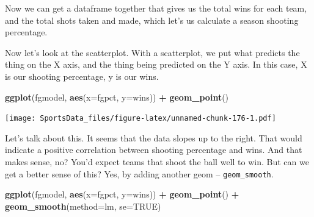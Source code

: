 \documentclass[]{book}
\newenvironment{Shaded}{\begin{snugshade}}{\end{snugshade}}
\newcommand{\DataTypeTok}[1]{\textcolor[rgb]{0.13,0.29,0.53}{#1}}
\newcommand{\KeywordTok}[1]{\textcolor[rgb]{0.13,0.29,0.53}{\textbf{#1}}}
\newcommand{\NormalTok}[1]{#1}
\newcommand{\OperatorTok}[1]{\textcolor[rgb]{0.81,0.36,0.00}{\textbf{#1}}}
\newcommand{\OtherTok}[1]{\textcolor[rgb]{0.56,0.35,0.01}{#1}}
\newcommand{\StringTok}[1]{\textcolor[rgb]{0.31,0.60,0.02}{#1}}
\begin{document}
Now we can get a dataframe together that gives us the total wins for each team, and the total shots taken and made, which let's us calculate a season shooting percentage.

\begin{Shaded}
\end{Shaded}

Now let's look at the scatterplot. With a scatterplot, we put what predicts the thing on the X axis, and the thing being predicted on the Y axis. In this case, X is our shooting percentage, y is our wins.

\begin{Shaded}
\begin{Highlighting}[]
\KeywordTok{ggplot}\NormalTok{(fgmodel, }\KeywordTok{aes}\NormalTok{(}\DataTypeTok{x=}\NormalTok{fgpct, }\DataTypeTok{y=}\NormalTok{wins)) }\OperatorTok{+}\StringTok{ }\KeywordTok{geom_point}\NormalTok{()}
\end{Highlighting}
\end{Shaded}

\texttt{[image: SportsData\_files/figure-latex/unnamed-chunk-176-1.pdf]}

Let's talk about this. It seems that the data slopes up to the right. That would indicate a positive correlation between shooting percentage and wins. And that makes sense, no? You'd expect teams that shoot the ball well to win. But can we get a better sense of this? Yes, by adding another geom -- \texttt{geom\_smooth}.

\begin{Shaded}
\begin{Highlighting}[]
\KeywordTok{ggplot}\NormalTok{(fgmodel, }\KeywordTok{aes}\NormalTok{(}\DataTypeTok{x=}\NormalTok{fgpct, }\DataTypeTok{y=}\NormalTok{wins)) }\OperatorTok{+}\StringTok{ }\KeywordTok{geom_point}\NormalTok{() }\OperatorTok{+}\StringTok{ }\KeywordTok{geom_smooth}\NormalTok{(}\DataTypeTok{method=}\NormalTok{lm, }\DataTypeTok{se=}\OtherTok{TRUE}\NormalTok{)}
\end{Highlighting}
\end{Shaded}
\end{document}
